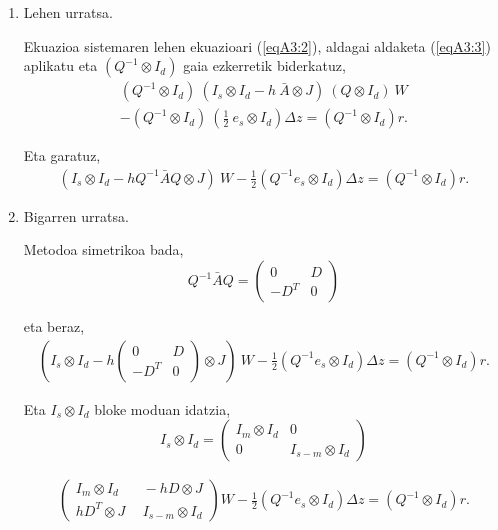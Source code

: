 \begin{enumerate}

\item Lehen urratsa.

Ekuazioa sistemaren lehen ekuazioari (\ref{eqA3:2}), aldagai aldaketa (\ref{eqA3:3}) aplikatu eta $(Q^{-1} \otimes I_d)$ gaia ezkerretik biderkatuz,
\begin{multline*}
(Q^{-1} \otimes I_d) \ (I_s \otimes I_d- h \ \bar{A} \otimes J) \ (Q \otimes I_d) \ W \\
  - (Q^{-1} \otimes I_d) \ (\frac{1}{2} \ e_s \otimes I_d) \Delta z = (Q^{-1} \otimes I_d) r.
\end{multline*}

Eta garatuz,
\begin{multline*}
(I_s \otimes I_d- h Q^{-1} \bar{A} Q \otimes J) \ W 
- \frac{1}{2}(Q^{-1}  e_s \otimes I_d) \Delta z = (Q^{-1} \otimes I_d) r.
\end{multline*}

\item Bigarren urratsa.

Metodoa simetrikoa bada,
\begin{equation}
\label{eq:DD}
Q^{-1} \bar A  Q = 
\left(
\begin{matrix}
0 & D \\
-D^T & 0 
\end{matrix}
\right)
\end{equation}

eta beraz,
\begin{multline*}
(I_s \otimes I_d- h
\left(
\begin{matrix}
0 & D \\
-D^T & 0 
\end{matrix}  
\right) \otimes J) \ W 
- \frac{1}{2}(Q^{-1}  e_s \otimes I_d) \Delta z = (Q^{-1} \otimes I_d) r.
\end{multline*}

Eta $I_s \otimes I_d$ bloke moduan idatzia,
\begin{equation}
\label{eq:xx}
I_s \otimes I_d =
\left(
\begin{matrix}
I_m \otimes I_d & 0 \\
0  & I_{s-m} \otimes I_d 
\end{matrix}
\right)
\end{equation}

\begin{multline*}
\left(
\begin{matrix}
I_m \otimes I_d & \ \ -h D \otimes J \\
hD^T \otimes J &  \ \ I_{s-m} \otimes I_d 
\end{matrix}
\right)
 W- \frac{1}{2}(Q^{-1}  e_s \otimes I_d) \Delta z = (Q^{-1} \otimes I_d) r.
\end{multline*}


\end{enumerate}
